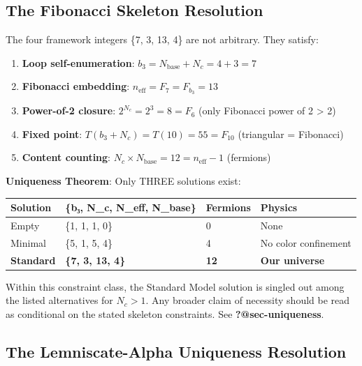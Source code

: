 \documentclass[
  11pt,
  letterpaper,
  twoside,
  openany]{book}
\makeatletter
\providecommand{\tightlist}{%
  \setlength{\itemsep}{0pt}\setlength{\parskip}{0pt}}
\let\orig@subsection\subsection
\renewcommand{\subsection}{\needspace{6\baselineskip}\orig@subsection}
\makeatother
\begin{document}
\subsection{The Fibonacci Skeleton
Resolution}\label{the-fibonacci-skeleton-resolution}

The four framework integers \{7, 3, 13, 4\} are not arbitrary. They
satisfy:

\begin{enumerate}
\def\labelenumi{\arabic{enumi}.}
\tightlist
\item
  \textbf{Loop self-enumeration}:
  \(b_3 = N_{\text{base}} + N_c = 4 + 3 = 7\)
\item
  \textbf{Fibonacci embedding}: \(n_{\text{eff}} = F_7 = F_{b_3} = 13\)
\item
  \textbf{Power-of-2 closure}: \(2^{N_c} = 2^3 = 8 = F_6\) (only
  Fibonacci power of 2 \textgreater{} 2)
\item
  \textbf{Fixed point}: \(T(b_3 + N_c) = T(10) = 55 = F_{10}\)
  (triangular = Fibonacci)
\item
  \textbf{Content counting}:
  \(N_c \times N_{\text{base}} = 12 = n_{\text{eff}} - 1\) (fermions)
\end{enumerate}

\textbf{Uniqueness Theorem}: Only THREE solutions exist:

\begin{longtable}[]{@{}llll@{}}
\toprule\noalign{}
Solution & \{b₃, N\_c, N\_eff, N\_base\} & Fermions & Physics \\
\midrule\noalign{}
\endhead
\bottomrule\noalign{}
\endlastfoot
Empty & \{1, 1, 1, 0\} & 0 & None \\
Minimal & \{5, 1, 5, 4\} & 4 & No color confinement \\
\textbf{Standard} & \textbf{\{7, 3, 13, 4\}} & \textbf{12} & \textbf{Our
universe} \\
\end{longtable}

Within this constraint class, the Standard Model solution is singled out
among the listed alternatives for \(N_c > 1\). Any broader claim of
necessity should be read as conditional on the stated skeleton
constraints. See \textbf{?@sec-uniqueness}.

\subsection{The Lemniscate-Alpha Uniqueness
Resolution}\label{the-lemniscate-alpha-uniqueness-resolution}
\end{document}
